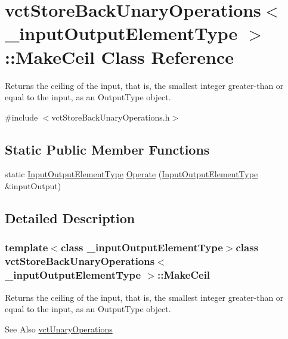 \hypertarget{classvct_store_back_unary_operations_1_1_make_ceil}{\section{vct\-Store\-Back\-Unary\-Operations$<$ \-\_\-input\-Output\-Element\-Type $>$\-:\-:Make\-Ceil Class Reference}
\label{classvct_store_back_unary_operations_1_1_make_ceil}
}


Returns the ceiling of the input, that is, the smallest integer greater-\/than or equal to the input, as an Output\-Type object.  




{\ttfamily \#include $<$vct\-Store\-Back\-Unary\-Operations.\-h$>$}

\subsection*{Static Public Member Functions}
\begin{DoxyCompactItemize}
\item 
static \hyperlink{classvct_store_back_unary_operations_a8af17faaa73a8d090094d468eee32062}{Input\-Output\-Element\-Type} \hyperlink{classvct_store_back_unary_operations_1_1_make_ceil_a8a57aaf0abb59856b5ef4579de93aa78}{Operate} (\hyperlink{classvct_store_back_unary_operations_a8af17faaa73a8d090094d468eee32062}{Input\-Output\-Element\-Type} \&input\-Output)
\end{DoxyCompactItemize}


\subsection{Detailed Description}
\subsubsection*{template$<$class \-\_\-input\-Output\-Element\-Type$>$class vct\-Store\-Back\-Unary\-Operations$<$ \-\_\-input\-Output\-Element\-Type $>$\-::\-Make\-Ceil}

Returns the ceiling of the input, that is, the smallest integer greater-\/than or equal to the input, as an Output\-Type object. 

\begin{DoxySeeAlso}{See Also}
\hyperlink{classvct_unary_operations}{vct\-Unary\-Operations} 
\end{DoxySeeAlso}


